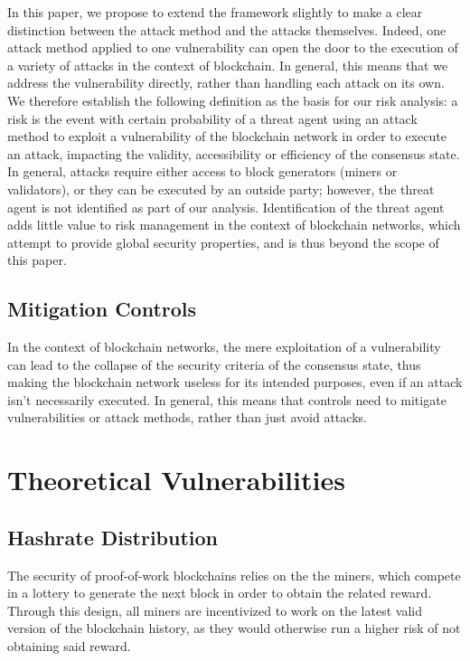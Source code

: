 \documentclass[12pt,a4paper]{article}
\begin{document}
In this paper, we propose to extend the framework slightly to make a clear distinction between the attack method and the attacks themselves. Indeed, one attack method applied to one vulnerability can open the door to the execution of a variety of attacks in the context of blockchain. In general, this means that we address the vulnerability directly, rather than handling each attack on its own.\\

We therefore establish the following definition as the basis for our risk analysis: a risk is the event with certain probability of a threat agent using an attack method to exploit a vulnerability of the blockchain network in order to execute an attack, impacting the validity, accessibility or efficiency of the consensus state.\\

In general, attacks require either access to block generators (miners or validators), or they can be executed by an outside party; however, the threat agent is not identified as part of our analysis. Identification of the threat agent adds little value to risk management in the context of blockchain networks, which attempt to provide global security properties, and is thus beyond the scope of this paper.\\

\subsection{Mitigation Controls}

In the context of blockchain networks, the mere exploitation of a vulnerability can lead to the collapse of the security criteria of the consensus state, thus making the blockchain network useless for its intended purposes, even if an attack isn't necessarily executed. In general, this means that controls need to mitigate vulnerabilities or attack methods, rather than just avoid attacks.\\

\section{Theoretical Vulnerabilities}

\subsection{Hashrate Distribution}

The security of proof-of-work blockchains relies on the the miners, which compete in a lottery to generate the next block in order to obtain the related reward. Through this design, all miners are incentivized to work on the latest valid version of the blockchain history, as they would otherwise run a higher risk of not obtaining said reward.\\
\end{document}
